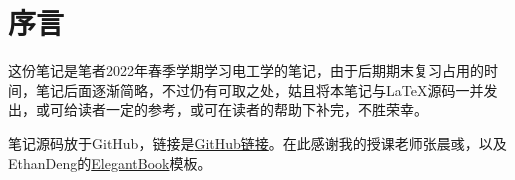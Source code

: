 \chapter*{序言}

这份笔记是笔者2022年春季学期学习电工学的笔记，由于后期期末复习占用的时间，笔记后面逐渐简略，不过仍有可取之处，姑且将本笔记与\LaTeX{}源码一并发出，或可给读者一定的参考，或可在读者的帮助下补完，不胜荣幸。

笔记源码放于GitHub，链接是\href{https://github.com/ChuJiuMao/electrotechnology-and-electronics}{GitHub链接}。在此感谢我的授课老师张晨彧，以及EthanDeng的\href{https://github.com/ElegantLaTeX/ElegantBook}{ElegantBook}模板。

